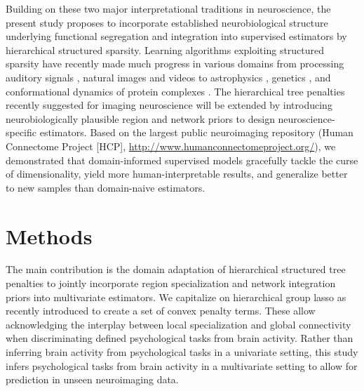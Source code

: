 \documentclass{article}
\begin{document}
Building on these two major interpretational traditions in neuroscience,
the present study proposes to incorporate
established neurobiological structure underlying
functional segregation and integration
into supervised estimators
by hierarchical structured sparsity.
%
Learning algorithms
exploiting structured sparsity 
have recently made much progress in various domains
from processing auditory signals \cite{daudet2004sparse},
natural images \cite{harzallah2009combining} and
videos \cite{kang2015structured}
to
astrophysics \cite{vinci2014estimating},
genetics \cite{kim2012tree},
and
conformational dynamics of protein complexes \cite{jenatton2009structured}.
%
The hierarchical tree penalties recently suggested for imaging neuroscience
\cite{jenatton2011multi} will be extended
by introducing neurobiologically plausible region and network priors
to design neuroscience-specific estimators.
%
Based on the largest public neuroimaging repository
(Human Connectome Project [HCP], \url{http://www.humanconnectomeproject.org/}),
we demonstrated that domain-informed supervised models
gracefully tackle the curse of dimensionality,
yield more human-interpretable results,
and generalize better to new samples
than domain-naive estimators.

\section{Methods}
The main contribution is the domain adaptation of hierarchical structured
tree penalties to jointly incorporate region 
specialization and network integration priors into multivariate 
estimators.
We capitalize on hierarchical group lasso as recently introduced
\cite{jenatton2011multi} to create a set of convex penalty terms.
These allow acknowledging the interplay between local specialization and 
global connectivity when discriminating defined psychological tasks
from brain activity.
Rather than inferring brain activity from psychological tasks
in a univariate setting,
this study infers psychological tasks from brain activity
in a multivariate setting to allow for
prediction in unseen neuroimaging data.
%
\end{document}
